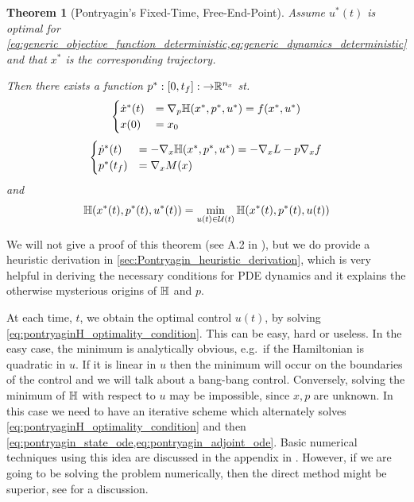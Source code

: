 \documentclass{article}
\newtheorem{thm}{Theorem}[section]
\begin{document}
\begin{thm}[Pontryagin's Fixed-Time, Free-End-Point] Assume $u^*(t)$ is
optimal for
\cref{eq:generic_objective_function_deterministic,eq:generic_dynamics_deterministic}
and that $x^*$ is the corresponding trajectory. 

Then there exists a function $p^*:[0,{ t_f }]:{\rightarrow} { \mathbb{R} }^{n_x}$ st.
\begin{equation}
\begin{cases}
\dot{x}^*(t) &=  { \nabla }_p { \mathbb{H}}(x^*,p^*, u^*) = f(x^*, u^*)
\\
x(0) &= x_0
\end{cases}
\label{eq:pontryagin_state_ode}
\end{equation}
\begin{equation}
\begin{cases}
\dot{p}^*(t) &= -{ \nabla }_x { \mathbb{H}}(x^*,p^*, u^*) = -{ \nabla }_xL - p { \nabla }_x f
\\
p^*({ t_f }) &= { \nabla }_x M(x)
\end{cases}
\label{eq:pontryagin_adjoint_ode} 
\end{equation}
and
\begin{equation}
{ \mathbb{H}}(x^*(t), p^*(t), u^*(t)) = \min_{u(t) \in { \mathcal{U} }(t)}  { \mathbb{H}}(x^*(t), p^*(t),
u(t))
\label{eq:pontryaginH_optimality_condition} 
\end{equation}
\end{thm}
We will not give a proof of this theorem (see A.2 in \cite{Evansb}),
but we do provide a heuristic derivation in
\cref{sec:Pontryagin_heuristic_derivation}, which is very helpful in deriving
the necessary conditions for PDE dynamics and it explains the otherwise
mysterious origins of ${ \mathbb{H}}$ and $p$. 

At each time, $t$, we obtain the optimal control $u(t)$, by solving
\cref{eq:pontryaginH_optimality_condition}. This can be easy, hard or useless.
In the easy case, the minimum is analytically obvious, e.g.\ if the Hamiltonian
is quadratic in $u$. If it is linear in $u$ then the minimum will occur on the
boundaries of the control and we will talk about a bang-bang control.
Conversely, solving the minimum of ${ \mathbb{H}}$ with respect to $u$ may be impossible,
since $x,p$ are unknown. In this case we need to have an iterative scheme which
alternately solves
\cref{eq:pontryaginH_optimality_condition} 
and then \cref{eq:pontryagin_state_ode,eq:pontryagin_adjoint_ode}. Basic
numerical techniques using this idea are discussed in the appendix in
\cite{Kirk2004}. However, if we are going to be solving the problem numerically,
then the direct method might be superior, see \cite{Ross2005} for a discussion.
 
\end{document}
